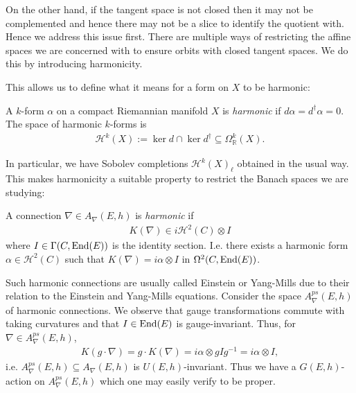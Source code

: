 \documentclass[12pt]{ociamthesis}  %
\begin{document}
On the other hand, if the tangent space is not closed then it may not be complemented and
hence there may not be a slice to identify the quotient with. Hence we address this issue first.
There are multiple ways of restricting the affine spaces we are concerned with to
ensure orbits with closed tangent spaces. We do this by introducing harmonicity.

This allows us to
define what it means for a form on $X$ to be harmonic:

\begin{definition}
  A $k$-form $\alpha$ on a compact Riemannian manifold $X$ is \emph{harmonic} if
  $d \alpha = d^\dagger \alpha = 0$. The space of harmonic $k$-forms is
  \begin{align*}
    \mathcal H^k(X) := \ker d \cap \ker d^\dagger \subseteq \Omega^k_{\mathbb{R}}(X).
  \end{align*}
\end{definition}

In particular, we have Sobolev completions $\mathcal H^k(X)_\ell$
obtained in the usual way. This makes harmonicity a suitable property to
restrict the Banach spaces we are studying:

\begin{definition}
  A connection $\nabla\in A_\nabla(E,h)$ is \emph{harmonic} if
  \begin{align}\label{eq:yang_mills_condition}
    K(\nabla) \in i\mathcal H^2(C)\otimes I
  \end{align}
  where $I\in\Gamma(C,\operatorname{End}(E))$ is the identity section.
  I.e. there exists a harmonic form $\alpha\in\mathcal H^2(C)$ such
  that $K(\nabla) = i\alpha\otimes I$ in $\Omega^2(C,\operatorname{End}(E))$.
\end{definition}

Such harmonic connections are usually called Einstein or Yang-Mills
due to their relation to the Einstein and Yang-Mills equations.
Consider the space $A_\nabla^{ps}(E,h)$ of harmonic connections.
We observe that gauge transformations commute with taking curvatures and
that $I\in\operatorname{End}(E)$ is gauge-invariant. Thus, for $\nabla\in A_\nabla^{ps}(E,h)$,
\begin{align*}
  K(g\cdot\nabla)
  = g\cdot K(\nabla)
  = i\alpha\otimes gIg^{-1}
  = i\alpha\otimes I,
\end{align*}
i.e. $A_\nabla^{ps}(E,h)\subseteq A_\nabla(E,h)$ is $U(E,h)$-invariant.
Thus we have a $G(E,h)$-action on $A^{ps}_\nabla(E,h)$ which
one may easily verify to be proper.
\end{document}
